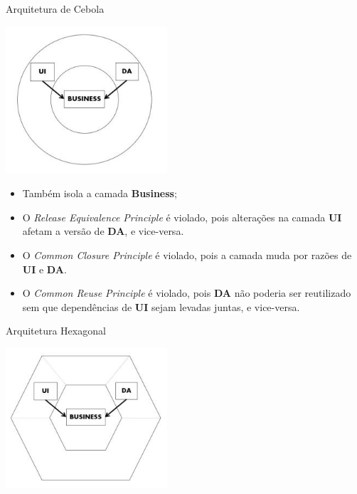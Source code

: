 \documentclass[aspectratio=169]{beamer}
\begin{document}
\begin{frame}{Arquitetura de Cebola}	
	\begin{multicols}{2}		
		\begin{center}
			\includegraphics[width=6cm]{imgs/onion-architecture}
		\end{center}
		\begin{itemize}	
			\item Também isola a camada \textbf{Business};
			\item O \textit{Release Equivalence Principle} é violado, pois  alterações na camada \textbf{UI} afetam a versão de \textbf{DA}, e vice-versa. 
			\item O \textit{Common Closure Principle} é violado, pois a camada muda por razões de \textbf{UI} e \textbf{DA}. 
			\item O \textit{Common Reuse Principle} é violado, pois \textbf{DA} não poderia ser reutilizado sem que dependências de \textbf{UI} sejam levadas juntas, e vice-versa.
		\end{itemize}
	\end{multicols}
\end{frame}

\begin{frame}{Arquitetura Hexagonal}			
	\begin{center}
		\includegraphics[width=6cm]{imgs/hexagonal}
	\end{center}
\end{frame}
\end{document}
